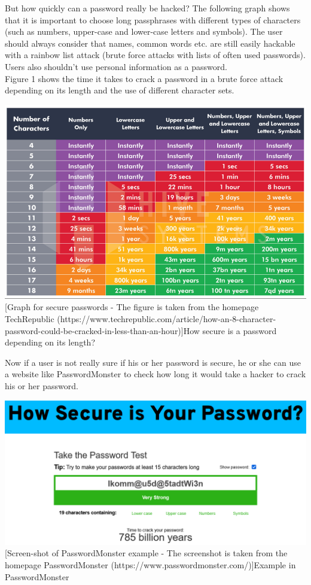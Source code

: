 \documentclass[conference]{IEEEtran}
\begin{document}
But how quickly can a password really be hacked? The following graph shows that it is important to choose long passphrases with different types of characters (such as numbers, upper-case and lower-case letters and symbols). The user should always consider that names, common words etc. are still easily hackable with a rainbow list attack (brute force attacks with lists of often used passwords). Users also shouldn't use personal information as a password.\\
Figure 1 shows the time it takes to crack a password in a brute force attack depending on its length and the use of different character sets.

\begin{center}
    \includegraphics[scale=0.335]{./images/brute_force.png}
    [Graph for secure passwords - The figure is taken from the homepage TechRepublic (https://www.techrepublic.com/article/how-an-8-character-password-could-be-cracked-in-less-than-an-hour)]{How secure is a password depending on its length?}
\end{center}

Now if a user is not really sure if his or her password is secure, he or she can use a website like PasswordMonster to check how long it would take a hacker to crack his or her password.\cite{b9}

\begin{center}
    \includegraphics[scale=0.37]{./images/PasswordMonster.png}
    [Screen-shot of PasswordMonster example  - The screenshot is taken from the homepage PasswordMonster (https://www.passwordmonster.com/)]{Example in PasswordMonster}
\end{center}
\end{document}
